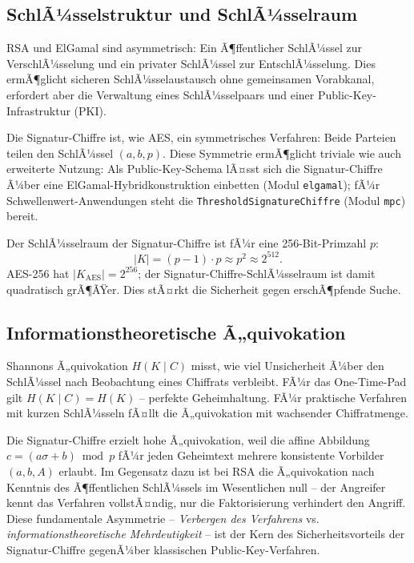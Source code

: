 ﻿\documentclass[a4paper,12pt]{scrreprt}
\theoremstyle{definition}
\begin{document}
\subsection{SchlÃ¼sselstruktur und SchlÃ¼sselraum}

RSA und ElGamal sind asymmetrisch: Ein Ã¶ffentlicher SchlÃ¼ssel zur VerschlÃ¼sselung und ein privater SchlÃ¼ssel zur EntschlÃ¼sselung. Dies ermÃ¶glicht sicheren SchlÃ¼sselaustausch ohne gemeinsamen Vorabkanal, erfordert aber die Verwaltung eines SchlÃ¼sselpaars und einer Public-Key-Infrastruktur (PKI).

Die Signatur-Chiffre ist, wie AES, ein symmetrisches Verfahren: Beide Parteien teilen den SchlÃ¼ssel $(a, b, p)$. Diese Symmetrie ermÃ¶glicht triviale wie auch erweiterte Nutzung: Als Public-Key-Schema lÃ¤sst sich die Signatur-Chiffre Ã¼ber eine ElGamal-Hybridkonstruktion einbetten (Modul \texttt{elgamal}); fÃ¼r Schwellenwert-Anwendungen steht die \texttt{Threshold\-Signature\-Chiffre} (Modul \texttt{mpc}) bereit.

Der SchlÃ¼sselraum der Signatur-Chiffre ist fÃ¼r eine 256-Bit-Primzahl $p$:
\[
|K| = (p-1)\cdot p \approx p^2 \approx 2^{512}.
\]
AES-256 hat $|K_{\mathrm{AES}}| = 2^{256}$; der Signatur-Chiffre-SchlÃ¼sselraum ist damit quadratisch grÃ¶ÃŸer. Dies stÃ¤rkt die Sicherheit gegen erschÃ¶pfende Suche.

\subsection{Informationstheoretische Ã„quivokation}

Shannons Ã„quivokation $H(K \mid C)$ misst, wie viel Unsicherheit Ã¼ber den SchlÃ¼ssel nach Beobachtung eines Chiffrats verbleibt. FÃ¼r das One-Time-Pad gilt $H(K \mid C) = H(K)$ -- perfekte Geheimhaltung. FÃ¼r praktische Verfahren mit kurzen SchlÃ¼sseln fÃ¤llt die Ã„quivokation mit wachsender Chiffratmenge.

Die Signatur-Chiffre erzielt hohe Ã„quivokation, weil die affine Abbildung $c = (a\sigma + b) \bmod p$ fÃ¼r jeden Geheimtext mehrere konsistente Vorbilder $(a,b,A)$ erlaubt. Im Gegensatz dazu ist bei RSA die Ã„quivokation nach Kenntnis des Ã¶ffentlichen SchlÃ¼ssels im Wesentlichen null -- der Angreifer kennt das Verfahren vollstÃ¤ndig, nur die Faktorisierung verhindert den Angriff. Diese fundamentale Asymmetrie -- \emph{Verbergen des Verfahrens} vs. \emph{informationstheoretische Mehrdeutigkeit} -- ist der Kern des Sicherheitsvorteils der Signatur-Chiffre gegenÃ¼ber klassischen Public-Key-Verfahren.
\end{document}
